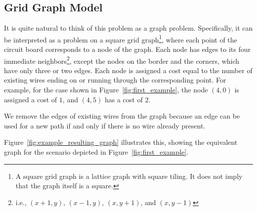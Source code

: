 \documentclass[sigconf,nonacm,screen]{acmart}
\begin{document}
\subsection{Grid Graph Model} \label{subsection:grid_graph_model}
It is quite natural to think of this problem as a graph problem. Specifically, it can be interpreted as a problem on a square grid graph\footnote{A square grid graph is a lattice graph with square tiling. It does not imply that the graph itself is a square.}, where each point of the circuit board corresponds to a node of the graph. Each node has edges to its four immediate neighbors\footnote{i.e., $(x+1,y)$, $(x-1,y)$, $(x,y+1)$, and $(x,y-1)$}, except the nodes on the border and the corners, which have only three or two edges.
Each node is assigned a cost equal to the number of existing wires ending on or running through the corresponding point. For example, for the case shown in Figure~\ref{fig:first_example}, the node $(4,0)$ is assigned a cost of $1$, and $(4,5)$ has a cost of $2$.

We remove the edges of existing wires from the graph because an edge can be used for a new path if and only if there is no wire already present. 

Figure~\ref{fig:example_resulting_graph} illustrates this, showing the equivalent graph for the scenario depicted in Figure~\ref{fig:first_example}.
\end{document}
